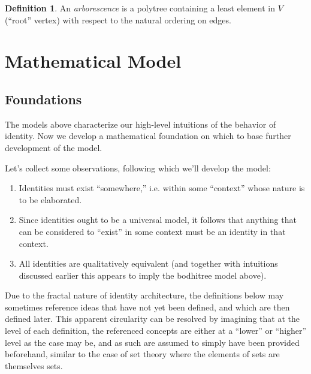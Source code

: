\documentclass[pra,twocolumn,groupedaddress,10pt]{revtex4}
\theoremstyle{definition}
\newtheorem{defn}{Definition}[section]
\begin{document}
\begin{defn}
	An \emph{arborescence} is a polytree containing a least element in $V$ (``root'' vertex) with respect to the natural ordering on edges.
\end{defn}

\section{Mathematical Model} \label{sec:matmod}

\subsection{Foundations} \label{sec:foundations}

The models above characterize our high-level intuitions of the behavior of identity. Now we develop a mathematical foundation on which to base further development of the model.

Let's collect some observations, following which we'll develop the model:

\begin{enumerate}
	\item Identities must exist ``somewhere,'' i.e. within some ``context'' whose nature is to be elaborated.
	\item Since identities ought to be a universal model, it follows that anything that can be considered to ``exist'' in some context must be an identity in that context.
	\item All identities are qualitatively equivalent (and together with intuitions discussed earlier this appears to imply the bodhitree model above).
\end{enumerate}

Due to the fractal nature of identity architecture, the definitions below may sometimes reference ideas that have not yet been defined, and which are then defined later. This apparent circularity can be resolved by imagining that at the level of each definition, the referenced concepts are either at a ``lower'' or ``higher'' level as the case may be, and as such are assumed to simply have been provided beforehand, similar to the case of set theory where the elements of sets are themselves sets.
\end{document}
